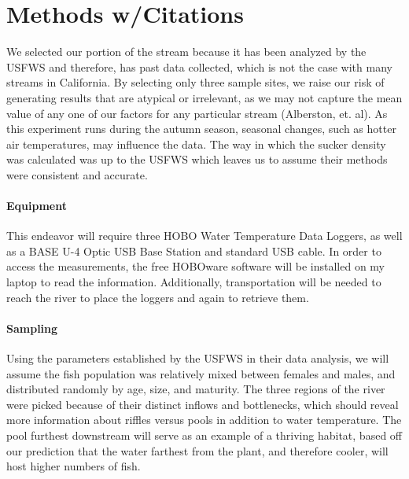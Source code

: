 \documentclass{tufte-handout}
\begin{document}
\section{Methods w/Citations} We selected our portion of the stream because it has been analyzed by the USFWS and therefore, has past data collected, which is not the case with many streams in California. By selecting only three sample sites, we raise our risk of generating results that are atypical or irrelevant, as we may not capture the mean value of any one of our factors for any particular stream (Alberston, et. al). As this experiment runs during the autumn season, seasonal changes, such as hotter air temperatures, may influence the data. The way in which the sucker density was calculated was up to the USFWS which leaves us to assume their methods were consistent and accurate. 

\paragraph{Equipment}
This endeavor will require three HOBO Water Temperature Data Loggers, as well as a BASE U-4 Optic USB Base Station and standard USB cable. In order to access the measurements, the free HOBOware software will be installed on my laptop to read the information. Additionally, transportation will be needed to reach the river to place the loggers and again to retrieve them.

\paragraph{Sampling} Using the parameters established by the USFWS in their data analysis, we will assume the fish population was relatively mixed between females and males, and distributed randomly by age, size, and maturity. The three regions of the river were picked because of their distinct inflows and bottlenecks, which should reveal more information about riffles versus pools in addition to water temperature. The pool furthest downstream will serve as an example of a thriving habitat, based off our prediction that the water farthest from the plant, and therefore cooler, will host higher numbers of fish.
\end{document}
